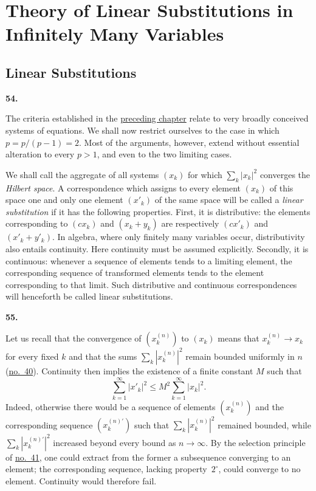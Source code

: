 \documentclass[
  paper=b5,
  fontsize=13pt,
  twoside=true,
  open=any,
  bookmarkpackage=false,
  chapterprefix=true,
  headings=normal
]{scrbook}
\theoremstyle{definition}
\newcommand{\numberedparagraph}[1]{%
  \par\medskip\phantomsection\label{sec:#1}%
  \noindent\textbf{#1.}\enspace
}
\begin{document}
\chapter{Theory of Linear Substitutions in Infinitely Many Variables}\label{chap:4}

\section{Linear Substitutions}\label{sec:linear-substitutions}

\numberedparagraph{54}
The criteria established in the \hyperref[chap:3]{preceding chapter} relate to very broadly
conceived systems of equations. We shall now restrict ourselves to the case
in which $p=p/(p-1)=2$. Most of the arguments, however, extend without
essential alteration to every $p>1$, and even to the two limiting cases.

We shall call the aggregate of all systems $(x_k)$ for which
$\sum_k|x_k|^2$ converges the \emph{Hilbert space}. A correspondence which
assigns to every element $(x_k)$ of this space one and only one element
$(x'_k)$ of the same space will be called a \emph{linear substitution} if it
has the following properties. First, it is distributive: the elements
corresponding to $(c x_k)$ and $(x_k+y_k)$ are respectively $(c x'_k)$ and
$(x'_k+y'_k)$. In algebra, where only finitely many variables occur,
distributivity also entails continuity. Here continuity must be assumed
explicitly. Secondly, it is continuous: whenever a sequence of elements
tends to a limiting element, the corresponding sequence of transformed
elements tends to the element corresponding to that limit. Such
distributive and continuous correspondences will henceforth be called
linear substitutions.

\numberedparagraph{55}
Let us recall that the convergence of $(x_k^{(n)})$ to $(x_k)$ means that
$x_k^{(n)}\to x_k$ for every fixed $k$ and that the sums
$\sum_k|x_k^{(n)}|^2$ remain bounded uniformly in $n$
(\hyperref[sec:40]{no.~40}). Continuity then implies the existence of a
finite constant $M$ such that
\begin{equation}
  \sum_{k=1}^{\infty}|x'_k|^2
  \leq M^2\sum_{k=1}^{\infty}|x_k|^2.
  \tag{1}\label{eq:55:1}
\end{equation}
Indeed, otherwise there would be a sequence of elements $(x_k^{(n)})$ and the
corresponding sequence $(x_k^{(n)\prime})$ such that
$\sum_k|x_k^{(n)}|^2$ remained bounded, while
$\sum_k|x_k^{(n)\prime}|^2$ increased beyond every bound as $n\to\infty$.
By the selection principle of \hyperref[sec:41]{no.~41}, one could extract
from the former a subsequence converging to an element; the corresponding
sequence, lacking property~\(2^\circ\), could converge to no element.
Continuity would therefore fail.
\end{document}
